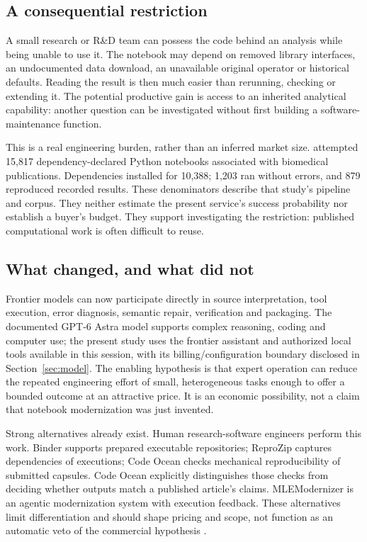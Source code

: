 \subsection{A consequential restriction}
A small research or R\&D team can possess the code behind an analysis while being unable to use it. The notebook may depend on removed library interfaces, an undocumented data download, an unavailable original operator or historical defaults. Reading the result is then much easier than rerunning, checking or extending it. The potential productive gain is access to an inherited analytical capability: another question can be investigated without first building a software-maintenance function.

This is a real engineering burden, rather than an inferred market size. \citet{samuel2024} attempted 15,817 dependency-declared Python notebooks associated with biomedical publications. Dependencies installed for 10,388; 1,203 ran without errors, and 879 reproduced recorded results. These denominators describe that study's pipeline and corpus. They neither estimate the present service's success probability nor establish a buyer's budget. They support investigating the restriction: published computational work is often difficult to reuse.

\subsection{What changed, and what did not}
Frontier models can now participate directly in source interpretation, tool execution, error diagnosis, semantic repair, verification and packaging. The documented GPT-6 Astra model supports complex reasoning, coding and computer use; the present study uses the frontier assistant and authorized local tools available in this session, with its billing/configuration boundary disclosed in Section~\ref{sec:model}. The enabling hypothesis is that expert operation can reduce the repeated engineering effort of small, heterogeneous tasks enough to offer a bounded outcome at an attractive price. It is an economic possibility, not a claim that notebook modernization was just invented.

Strong alternatives already exist. Human research-software engineers perform this work. Binder supports prepared executable repositories; ReproZip captures dependencies of executions; Code Ocean checks mechanical reproducibility of submitted capsules. Code Ocean explicitly distinguishes those checks from deciding whether outputs match a published article's claims. MLEModernizer is an agentic modernization system with execution feedback. These alternatives limit differentiation and should shape pricing and scope, not function as an automatic veto of the commercial hypothesis \citep{vanderbilt,binder,reprozip,codeocean,modernizer2026}.

